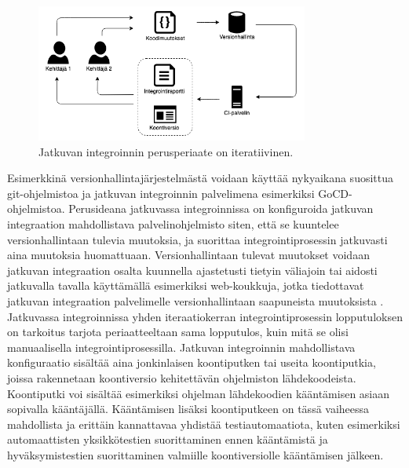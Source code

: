   \begin{figure}[H]
    \centering
    \includegraphics[width=0.8\textwidth]{assets/jatkuva-integrointi.png}
    \caption{Jatkuvan integroinnin perusperiaate on iteratiivinen.}
    \label{fig:jatkuva-integrointi}
  \end{figure}

  Esimerkkinä ver\-si\-on\-hal\-lin\-ta\-jär\-jes\-tel\-mä\-stä  voidaan käyttää nykyaikana suosittua git-oh\-jel\-mis\-to\-a  ja jatkuvan integroinnin palvelimena esimerkiksi GoCD-oh\-jel\-mis\-to\-a.
  Perusideana jatkuvassa integroinnissa on konfiguroida jatkuvan integraation mahdollistava palvelinohjelmisto siten, että se kuuntelee versionhallintaan tulevia muutoksia, ja suorittaa integrointiprosessin jatkuvasti aina muutoksia huomattuaan.
  Versionhallintaan tulevat muutokset voidaan jatkuvan integraation osalta kuunnella ajastetusti tietyin väliajoin tai aidosti jatkuvalla tavalla käyttämällä esimerkiksi web-koukkuja, jotka tiedottavat jatkuvan integraation palvelimelle versionhallintaan saapuneista muutoksista \cite{github_webhooks}.
  Jatkuvassa integroinnissa yhden iteraatiokerran integrointiprosessin lopputuloksen on tarkoitus tarjota periaatteeltaan sama lopputulos, kuin mitä se olisi manuaalisella integrointiprosessilla.
  Jatkuvan integroinnin mahdollistava konfiguraatio sisältää aina jonkinlaisen koontiputken tai useita koontiputkia, joissa rakennetaan koontiversio kehitettävän ohjelmiston lähdekoodeista.
  Koontiputki voi sisältää esimerkiksi ohjelman lähdekoodien kääntämisen asiaan sopivalla kääntäjällä.
  Kääntämisen lisäksi koontiputkeen on tässä vaiheessa mahdollista ja erittäin kannattavaa yhdistää testiautomaatiota, kuten esimerkiksi automaattisten yksikkötestien suorittaminen ennen kääntämistä ja hyväksymistestien suorittaminen valmiille koontiversiolle kääntämisen jälkeen.

